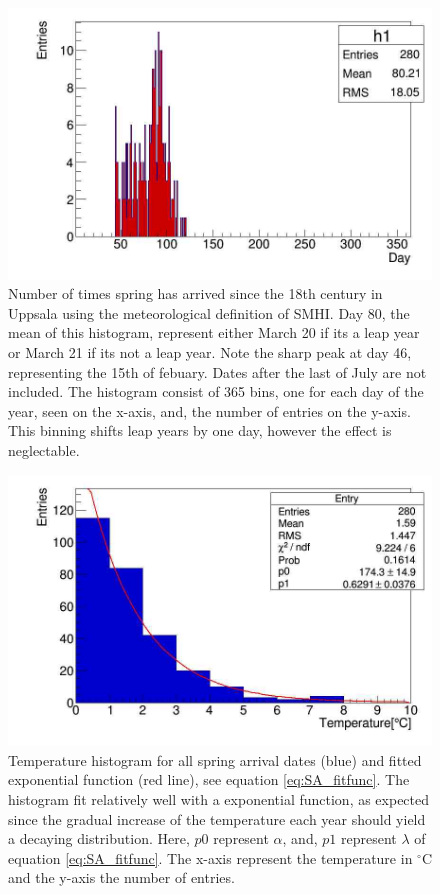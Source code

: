 \documentclass[a4paper,12pt]{article}
\begin{document}
\begin{figure}[htbp]
	\centering
	\includegraphics[scale=.3]{../Code/springArrive_dayHist.jpg}
	\caption{Number of times spring has arrived since the 18th century 
	in Uppsala using the meteorological definition of SMHI. Day 80, the 
	mean of this histogram, represent either March 20 if its a leap year 
	or March 21 if its not a leap year. Note the sharp peak at day 46, 
	representing the 15th of febuary. Dates after the last of July are not 
	included. The histogram consist of 365 bins, one for each day of the 
	year, seen on the x-axis, and, the number of entries on the y-axis. 
	This binning shifts leap years by one day, however the effect is 
	neglectable.}
	\label{fig:SA_dayHist}
\end{figure}
\begin{figure}[htbp]
	\centering
	\includegraphics[scale=.3]{../Code/springArrive_tempHist.jpg}
	\caption{Temperature histogram for all spring arrival dates (blue) and 
	fitted exponential function (red line), see equation 
	\eqref{eq:SA_fitfunc}. The histogram fit relatively well with a 
	exponential function, as expected since the gradual increase of the 
	temperature each year should yield a decaying distribution. Here, 
	$p0$ represent $\alpha$, and, $p1$ represent $\lambda$ of equation 
	\eqref{eq:SA_fitfunc}. The x-axis represent the temperature in 
	$^\circ$C and the y-axis the number of entries.}
	\label{fig:SA_tempHist}
\end{figure}
\end{document}
